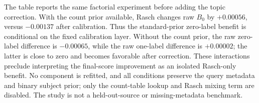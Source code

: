The table reports the same factorial experiment before adding the topic correction. With the count prior available, Rasch changes raw $B_0$ by $+0.00056$, versus $-0.00137$ after calibration. Thus the standard-prior zero-label benefit is conditional on the fixed calibration layer. Without the count prior, the raw zero-label difference is $-0.00065$, while the raw one-label difference is $+0.00002$; the latter is close to zero and becomes favorable after correction. These interactions preclude interpreting the final-score improvement as an isolated Rasch-only benefit. No component is refitted, and all conditions preserve the query metadata and binary subject prior; only the count-table lookup and Rasch mixing term are disabled. The study is not a held-out-source or missing-metadata benchmark.
